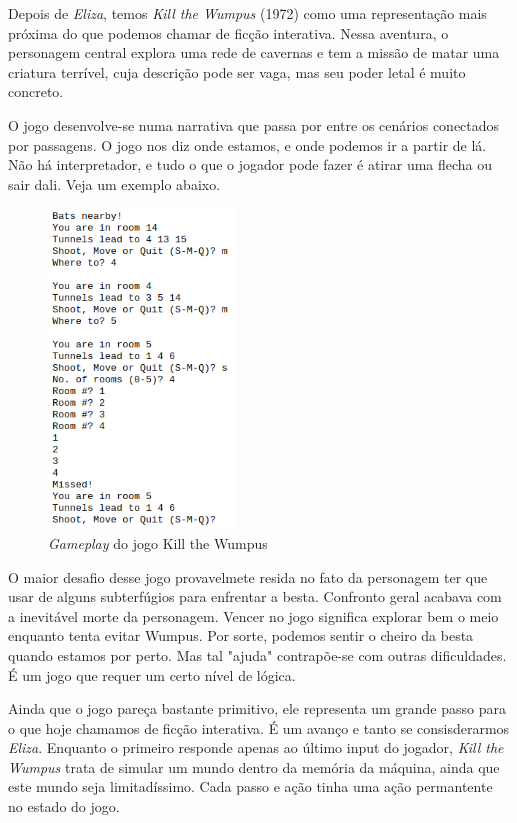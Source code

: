 Depois de \emph{Eliza}, temos \emph{Kill the Wumpus} (1972) como uma
representação mais próxima do que podemos chamar de ficção interativa. Nessa
aventura, o personagem central explora uma rede de cavernas e tem a missão de
matar uma criatura terrível, cuja descrição pode ser vaga, mas seu poder letal é
muito concreto.

O jogo desenvolve-se numa narrativa que passa por entre os cenários conectados
por passagens. O jogo nos diz onde estamos, e onde podemos ir a partir de lá.
Não há interpretador, e tudo o que o jogador pode fazer é atirar uma flecha ou
sair dali. Veja um exemplo abaixo.

\begin{figure}[htb]
\includegraphics[width=5cm]{figuras/wumpus}
\caption{\label{fig:wumpus} \emph{Gameplay} do jogo Kill the Wumpus}
\end{figure}

O maior desafio desse jogo provavelmete resida no fato da personagem ter que usar
de alguns subterfúgios para enfrentar a besta. Confronto geral acabava com a
inevitável morte da personagem. Vencer no jogo significa explorar bem o meio
enquanto tenta evitar Wumpus. Por sorte, podemos sentir o cheiro da besta quando
estamos por perto. Mas tal "ajuda" contrapõe-se com outras dificuldades. É um
jogo que requer um certo nível de lógica.

Ainda que o jogo pareça bastante primitivo, ele representa um grande passo para o
que hoje chamamos de ficção interativa. É um avanço e tanto se consisderarmos
\emph{Eliza}. Enquanto o primeiro responde apenas ao último input do jogador,
\emph{Kill the Wumpus} trata de simular um mundo dentro da memória da máquina,
ainda que este mundo seja limitadíssimo. Cada passo e ação tinha uma ação
permantente no estado do jogo.

